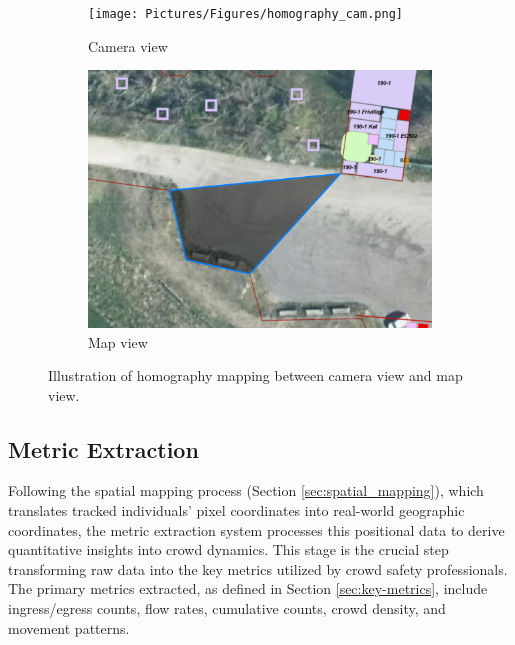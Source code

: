\begin{figure}[tbp!]
  \begin{subfigure}{0.46\textwidth}
    \centering
    \texttt{[image: Pictures/Figures/homography\_cam.png]}
    \caption{Camera view}
  \end{subfigure}%
  \hspace{0.06\textwidth}
  \begin{subfigure}{0.46\textwidth}
    \centering
    \includegraphics[width=\textwidth]{Pictures/Figures/homography_map.png}
    \caption{Map view}
  \end{subfigure}
  \caption{Illustration of homography mapping between camera view and map view.}
  \label{fig:homography_mapping}
\end{figure}


\subsection{Metric Extraction}
\label{sec:metric_extraction}

Following the spatial mapping process (Section \ref{sec:spatial_mapping}), which translates tracked individuals' pixel coordinates into real-world geographic coordinates, the metric extraction system processes this positional data to derive quantitative insights into crowd dynamics. This stage is the crucial step transforming raw data into the key metrics utilized by crowd safety professionals. The primary metrics extracted, as defined in Section \ref{sec:key-metrics}, include ingress/egress counts, flow rates, cumulative counts, crowd density, and movement patterns.

